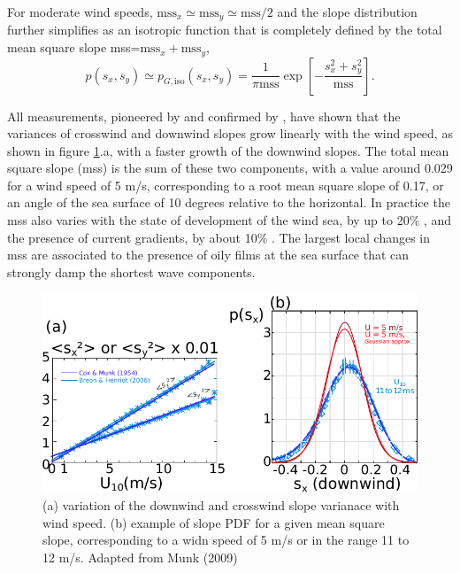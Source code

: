 For moderate wind speeds, $\mathrm{mss}_x \simeq \mathrm{mss}_y \simeq \mathrm{mss}/2$ and the slope distribution further simplifies as an isotropic function that is completely defined by the total mean square slope mss=$\mathrm{mss}_x +\mathrm{mss}_y$, 
\begin{equation}
p(s_x,s_y) \simeq p_{G,\mathrm{iso}}(s_x,s_y)=\frac{1}{ \pi \mathrm{mss}} \exp \left[- \frac{s_x^2+s_y^2}{\mathrm{mss}}\right].
\end{equation}


All measurements, pioneered by \cite{Cox&Munk1954} and confirmed by \cite{Breon&Henriot2006}, have shown that the variances of crosswind and downwind slopes grow linearly with the wind speed, as shown in figure \ref{fig:slope_pdf}.a, with a faster growth of the downwind slopes. The total mean square slope (mss) is the sum of these two components, with a value around 0.029 for a wind speed of 5 m/s, corresponding to a root mean square slope of 0.17, or an angle of the sea surface of 10 degrees relative to the horizontal. In practice the mss also varies with the state of development of the wind sea, by up to  20\% \citep[$\pm 1~dB$ in][]{Nouguier&al.2016}, and the presence of current gradients, by about 10\% \citep[e.g.][]{Rascle&al.2017}. The largest local changes in mss are associated to the presence of oily films at the sea surface that can strongly damp the shortest wave components. 

\begin{figure}[htb]
\centerline{\includegraphics[width=0.7\linewidth]{FIGS_CH_REMOTE/slope_pdf.pdf}}
\caption[]
{(a) variation of the downwind and crosswind slope varianace with wind speed. (b) example of slope PDF for a given mean square slope, corresponding to a widn speed of 5 m/s or in the range 11 to 12 m/s. Adapted from Munk (2009) \label{fig:slope_pdf}}
\end{figure}


